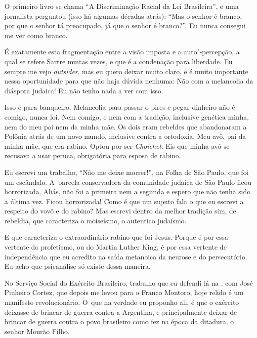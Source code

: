 O primeiro livro se chama ``A Discriminação Racial da Lei Brasileira'',
e uma jornalista perguntou (isso há algumas décadas atrás): ``Mas o
senhor é branco, por que o senhor tá preocupado, já que o senhor é
branco?''. Eu nunca consegui me ver como branco.

 

É exatamente esta fragmentação entre a visão imposta e a auto"-percepção,
a qual se refere Sartre muitas vezes, e que é a condenação para
liberdade. Eu sempre me vejo \emph{outsider}, mas eu quero deixar muito
claro, e é muito importante nessa oportunidade para que não haja dúvida
nenhuma: Não com a melancolia da diáspora judaica! Eu não tenho nada a
ver com isso.

 

Isso é para banqueiro. Melancolia para passar o pires e pegar dinheiro
não é comigo, nunca foi. Nem comigo, e nem com a tradição, inclusive
genética minha, nem do meu pai nem da minha mãe. Os dois eram rebeldes
que abandonaram a Polônia atrás de um novo mundo, inclusive contra a
ortodoxia. Meu avô, pai da minha mãe, que era rabino. Optou por ser
\emph{Choichet}. Eis que minha avó se recusava a usar peruca,
obrigatória para esposa de rabino.

 

Eu escrevi um trabalho, ``Não me deixe morrer!'', na Folha de São Paulo,
que foi um escândalo. A~parcela conservadora da comunidade judaica de
São Paulo ficou horrorizada. Aliás, não foi a primeira nem a segunda e
espero que não tenha sido a última vez. Ficou horrorizada! Como é que um
sujeito fala o que eu escrevi a respeito do vovô e do rabino? Mas
escrevi dentro da melhor tradição sim, de rebeldia, que caracteriza o
moiseísmo, o autentico judaísmo.

 

E que caracteriza o extraordinário rabino que foi Jesus. Porque é por
essa vertente do profetismo, ou do Martin Luther King, é por essa
vertente de independência que eu acredito na saída metanoica da neurose
e do persecutório. Eu acho que psicanálise só existe dessa maneira.

 

No Serviço Social do Exército Brasileiro, trabalho que eu defendi lá na
, com José Pinheiro Cortez, que depois me levou para o Franco
Montoro, hoje relido é um manifesto revolucionário. O~que na verdade eu
proponho ali, é que o exército deixasse de brincar de guerra contra a
Argentina, e principalmente deixar de brincar de guerra contra o povo
brasileiro como fez na época da ditadura, o senhor Mourão Filho.

